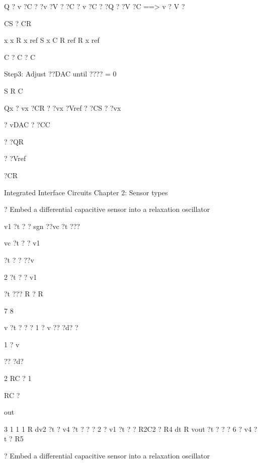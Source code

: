 \documentclass[2pt,landscape]{article}
\begin{document}
\begin{multicols*}{5}
Q ? v ?C ? ?v ?V	? ?C ? v ?C	? ?Q	? ?V	?C	==> v	? V	?


CS ? CR



x	x	R	x	ref	S	x	C	R	ref	R	x	ref


C ? C ? C


\textbullet 	Step3: Adjust ??DAC until ???? = 0


S	R	C


Qx  ? vx  ?CR  ? ?vx  ?Vref ? ?CS  ? ?vx


?	vDAC ? ?CC


? ?QR


? ?Vref


?CR











Integrated Interface Circuits \textbullet Chapter 2: Sensor types



?	Embed a differential capacitive sensor into a relaxation oscillator













v1 ?t ? ? sgn ??vc ?t ???


vc ?t ? ? v1


?t ? ? ??v


2 ?t ? ? v1


?t ??? R  ? R


7	8


v ?t ? ? ?	1	?	v ?? ?d? ?


1	?	v




?? ?d?


2	RC	? 1


RC	?


out


3	1	1	1
R	dv2 ?t ?
v4 ?t ? ? ?	2 ? v1 ?t ? ? R2C2 ?
R4	dt
R
vout ?t ? ? ?	6 ? v4 ?t ?
R5



?	Embed a differential capacitive sensor into a relaxation oscillator




































\end{multicols*}
\end{document}

